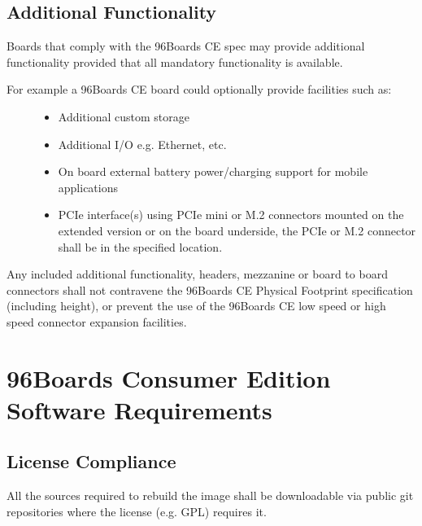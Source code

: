 \documentclass[a4paper,10pt,oneside,english]{sphinxmanual}
\begin{document}
\section{Additional Functionality}
\label{\detokenize{chapter1-ce:additional-functionality}}
\sphinxAtStartPar
Boards that comply with the 96Boards CE spec may provide additional functionality provided that all mandatory functionality is available.
\begin{description}
\item[{For example a 96Boards CE board could optionally provide facilities such as:}] \leavevmode\begin{itemize}
\item {} 
\sphinxAtStartPar
Additional custom storage

\item {} 
\sphinxAtStartPar
Additional I/O \sphinxhyphen{} e.g. Ethernet, etc.

\item {} 
\sphinxAtStartPar
On board external battery power/charging support for mobile applications

\item {} 
\sphinxAtStartPar
PCIe interface(s) using PCIe mini or M.2 connectors mounted on the extended version or on the board underside, the PCIe or M.2 connector shall be in the specified location.

\end{itemize}

\end{description}

\sphinxAtStartPar
Any included additional functionality, headers, mezzanine or board to board connectors shall not contravene the 96Boards CE Physical Footprint specification (including height), or prevent the use of the 96Boards CE low speed or high speed connector expansion facilities.


\chapter{96Boards Consumer Edition Software Requirements}
\label{\detokenize{chapter1-ce:boards-consumer-edition-software-requirements}}

\section{License Compliance}
\label{\detokenize{chapter1-ce:license-compliance}}
\sphinxAtStartPar
All the sources required to rebuild the image shall be downloadable via public git repositories where the license (e.g. GPL) requires it.
\end{document}
